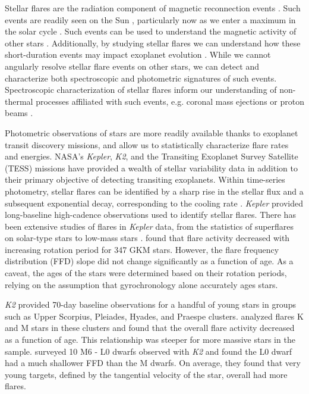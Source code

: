 \documentclass[twocolumn]{aastex631}
\begin{document}
Stellar flares are the radiation component of magnetic reconnection events \citep{benz10}. Such events are readily seen on the Sun \citep{carrington1859, lu91, fletcher11}, particularly now as we enter a maximum in the solar cycle \citep{webb94}. Such events can be used to understand the magnetic activity of other stars \citep{feigelson99, berdyugina05, kowalski10, feinstein22_criticality}. Additionally, by studying stellar flares we can understand how these short-duration events may impact exoplanet evolution \citep{france16, guenther19_flares, chen21}. While we cannot angularly resolve stellar flare events on other stars, we can detect and characterize both spectroscopic and photometric signatures of such events. Spectroscopic characterization of stellar flares inform our understanding of non-thermal processes affiliated with such events, e.g. coronal mass ejections \citep{argiroffi19, vida19} or proton beams \citep{orrall76, woodgate92}.

Photometric observations of stars are more readily available thanks to exoplanet transit discovery missions, and allow us to statistically characterize flare rates and energies. NASA's \textit{Kepler}, \textit{K2}, and the Transiting Exoplanet Survey Satellite (TESS) missions have provided a wealth of stellar variability data in addition to their primary objective of detecting transiting exoplanets.  Within time-series photometry, stellar flares can be identified by a sharp rise in the stellar flux and a subsequent exponential decay, corresponding to the cooling rate \citep{}. \textit{Kepler} \citep{Borucki10} provided long-baseline high-cadence observations used to identify stellar flares. There has been extensive studies of flares in \textit{Kepler} data, from the statistics of superflares on solar-type stars \citep[e.g.][]{notsu13, shibayama13, maehara15, okamoto21} to low-mass stars \citep[e.g.][]{Hawley14, silverberg16}. \cite{davenport19} found that flare activity decreased with increasing rotation period for 347 GKM stars. However, the flare frequency distribution (FFD) slope did not change significantly as a function of age. As a caveat, the ages of the stars were determined based on their rotation periods, relying on the assumption that gyrochronology alone accurately ages stars.

\textit{K2} provided 70-day baseline observations for a handful of young stars in groups such as Upper Scorpius,  Pleiades, Hyades, and Praespe clusters. \cite{ilin19, ilin21} analyzed flares K and M stars in these clusters and found that the overall flare activity decreased as a function of age. This relationship was steeper for more massive stars in the sample. \cite{paudel18} surveyed 10 M6 - L0 dwarfs observed with \textit{K2} and found the L0 dwarf had a much shallower FFD than the M dwarfs. On average, they found that very young targets, defined by the tangential velocity of the star, overall had more flares.
\end{document}
